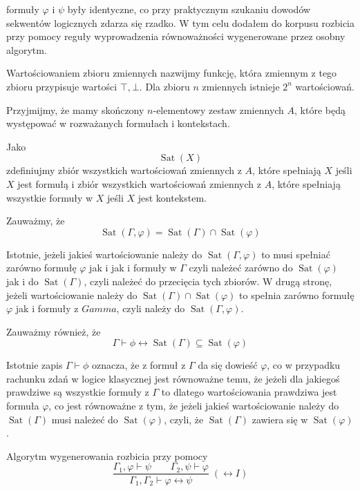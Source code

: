 \documentclass[shortabstract]{iithesis}
\theoremstyle{definition}
\theoremstyle{remark}
\theoremstyle{plain}
\begin{document}
formuły $\varphi$ i $\psi$ były identyczne, co przy praktycznym szukaniu dowodów sekwentów logicznych zdarza się
rzadko. W tym celu dodałem do korpusu rozbicia przy pomocy reguły wyprowadzenia równoważności wygenerowane przez 
osobny algorytm.

Wartościowaniem zbioru zmiennych nazwijmy funkcję, która zmiennym z tego zbioru przypisuje wartości $\top, \bot$.
Dla zbioru $n$ zmiennych istnieje $2^n$ wartościowań.

Przyjmijmy, że mamy skończony $n$-elementowy zestaw zmiennych $A$, które będą występować w rozważanych formułach i kontekstach.

Jako $$\operatorname{Sat}(X)$$ zdefiniujmy zbiór wszystkich wartościowań zmiennych z $A$, które spełniają $X$
jeśli $X$ jest formułą i zbiór wszystkich wartościowań zmiennych z $A$, które spełniają wszystkie 
formuły w $X$ jeśli $X$ jest kontekstem.

Zauważmy, że $$\operatorname{Sat}(\Gamma,\varphi) = \operatorname{Sat}(\Gamma) \cap \operatorname{Sat}(\varphi)$$

Istotnie, jeżeli jakieś wartościowanie należy do $\operatorname{Sat}(\Gamma,\varphi)$ to musi spełniać zarówno formułę
$\varphi$ jak i jak i formuły w $\Gamma$ czyli należeć zarówno do $\operatorname{Sat}(\varphi)$ jak i do $\operatorname{Sat}(\Gamma)$, czyli należeć do przecięcia tych zbiorów.
W drugą stronę, jeżeli wartościowanie należy do $\operatorname{Sat}(\Gamma) \cap \operatorname{Sat}(\varphi)$ to spełnia zarówno formułę $\varphi$ jak i formuły 
z $Gamma$, czyli należy do $\operatorname{Sat}(\Gamma,\varphi)$.

Zauważmy również, że 
$$\Gamma \vdash \phi \leftrightarrow \operatorname{Sat}(\Gamma)\subseteq \operatorname{Sat}(\varphi) $$

Istotnie zapis $\Gamma \vdash \phi$ oznacza, że z formuł z $\Gamma$ da się dowieść $\varphi$, co w przypadku rachunku zdań w logice klasycznej jest równoważne
temu, że jeżeli dla jakiegoś prawdziwe są wszystkie formuły z $\Gamma$ to dlatego wartościowania prawdziwa jest formuła $\varphi$, co jest równoważne z tym, że 
jeżeli jakieś wartościowanie należy do $\operatorname{Sat}(\Gamma)$ musi należeć do $\operatorname{Sat}(\varphi)$, czyli, że $\operatorname{Sat}(\Gamma)$
zawiera się w $\operatorname{Sat}(\varphi)$.

Algorytm wygenerowania rozbicia przy pomocy
$$\frac{\Gamma_1,\varphi \vdash \psi \qquad \Gamma_2,\psi \vdash \varphi}
     {\Gamma_1,\Gamma_2 \vdash \varphi \leftrightarrow \psi}\;(\leftrightarrow I)$$
\end{document}
